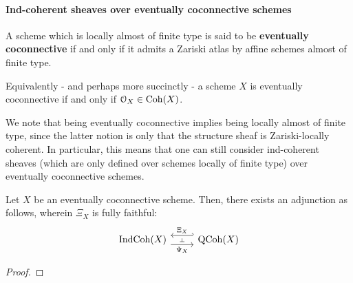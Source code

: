                 \paragraph{Ind-coherent sheaves over eventually coconnective schemes}
                    \begin{definition} \label{def: eventually_coconnective_schemes}
                        A scheme which is locally almost of finite type is said to be \textbf{eventually coconnective} if and only if it admits a Zariski atlas by affine schemes almost of finite type.
                        
                        Equivalently - and perhaps more succinctly - a scheme $X$ is eventually coconnective if and only if $\mathcal{O}_X \in \mathrm{Coh}(X)$.
                    \end{definition}
                    \begin{remark}
                        We note that being eventually coconnective implies being locally almost of finite type, since the latter notion is only that the structure sheaf is Zariski-locally coherent. In particular, this means that one can still consider ind-coherent sheaves (which are only defined over schemes locally of finite type) over eventually coconnective schemes.
                    \end{remark}
                    
                    \begin{proposition} \label{prop: canonical_adjunction} 
                        Let $X$ be an eventually coconnective scheme. Then, there exists an adjunction as follows, wherein $\Xi_X$ is fully faithful:
                            $$
                                \begin{tikzcd}
                                	{\Ind\Coh(X)} & {\QCoh(X)}
                                	\arrow[""{name=0, anchor=center, inner sep=0}, "{\Psi_X}"', shift right=2, from=1-1, to=1-2]
                                	\arrow[""{name=1, anchor=center, inner sep=0}, "{\Xi_X}"', shift right=2, hook', from=1-2, to=1-1]
                                	\arrow["\dashv"{anchor=center, rotate=-90}, draw=none, from=1, to=0]
                                \end{tikzcd}
                            $$
                    \end{proposition}
                        \begin{proof}
                            
                        \end{proof}
                
